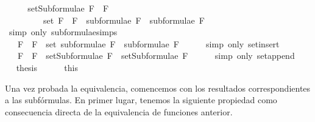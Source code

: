 \begin{isabellebody}
%
\isadelimproof
%
\endisadelimproof
%
\isatagproof
{}\isamarkupfalse%
\ {\isacharminus}\isanewline
\ \ \isamarkupfalse%
\ {\isachardoublequoteopen}setSubformulae\ {\isacharparenleft}F{}\ \isactrlbold {\isasymrightarrow}\ F{}{\isacharparenright}\ \isanewline
\ \ \ \ \ \ \ \ {\isacharequal}\ set\ {\isacharparenleft}{\isacharparenleft}F{}\ \isactrlbold {\isasymrightarrow}\ F{}{\isacharparenright}\ {\isacharhash}\ {\isacharparenleft}subformulae\ F{}\ {\isacharat}\ subformulae\ F{}{\isacharparenright}{\isacharparenright}{\isachardoublequoteclose}\isanewline
\ \ \ \ \isamarkupfalse%
\ {\isacharparenleft}simp\ only{\isacharcolon}\ subformulae{\isachardot}simps{\isacharparenleft}{}{\isacharparenright}{\isacharparenright}\isanewline
\ \ \isamarkupfalse%
\ \isamarkupfalse%
\ {\isachardoublequoteopen}{\isasymdots}\ {\isacharequal}\ {\isacharbraceleft}F{}\ \isactrlbold {\isasymrightarrow}\ F{}{\isacharbraceright}\ {\isasymunion}\ {\isacharparenleft}set\ {\isacharparenleft}subformulae\ F{}\ {\isacharat}\ subformulae\ F{}{\isacharparenright}{\isacharparenright}{\isachardoublequoteclose}\isanewline
\ \ \ \ \isamarkupfalse%
\ {\isacharparenleft}simp\ only{\isacharcolon}\ set{\isacharunderscore}insert{\isacharparenright}\isanewline
\ \ \isamarkupfalse%
\ \isamarkupfalse%
\ {\isachardoublequoteopen}{\isasymdots}\ {\isacharequal}\ {\isacharbraceleft}F{}\ \isactrlbold {\isasymrightarrow}\ F{}{\isacharbraceright}\ {\isasymunion}\ {\isacharparenleft}setSubformulae\ F{}\ {\isasymunion}\ setSubformulae\ F{}{\isacharparenright}{\isachardoublequoteclose}\isanewline
\ \ \ \ \isamarkupfalse%
\ {\isacharparenleft}simp\ only{\isacharcolon}\ set{\isacharunderscore}append{\isacharparenright}\isanewline
\ \ \isamarkupfalse%
\ \isamarkupfalse%
\ {\isacharquery}thesis\isanewline
\ \ \ \ \isamarkupfalse%
\ this\isanewline
{}\isamarkupfalse%
%
\endisatagproof
{\isafoldproof}%
%
\isadelimproof
%
\endisadelimproof
%
\begin{isamarkuptext}%
Una vez probada la equivalencia, comencemos con los resultados correspondientes a 
  las subfórmulas. En primer lugar, tenemos la siguiente propiedad como consecuencia directa
  de la equivalencia de funciones anterior.


\end{isamarkuptext}
\end{isabellebody}
